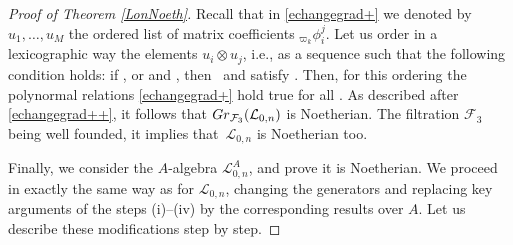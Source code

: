 \documentclass[11pt]{article}
\numberwithin{equation}{section}
\numberwithin{equation}{section}
\theoremstyle{definition}
\newcommand{\Ll}{{\mathcal L}}
\begin{document}
\begin{proof}[Proof of Theorem \ref{LonNoeth}]
Recall that in \eqref{echangegrad+} we denoted by $u_1,\dots,u_M$ the ordered list of matrix coefficients ${}_{\varpi_k}\phi_{i}^{j}$. Let us order in a lexicographic way the elements $u_i\otimes u_j$, i.e., as a sequence  such that the following condition holds: if , or  and , then~ and  satisfy . Then, for this ordering the polynormal relations \eqref{echangegrad+} hold true for all . As described after \eqref{echangegrad++}, it follows that ${\rm Gr}_{\mathcal{F}_3}(\Ll_{0,n})$ is Noetherian. The filtration $\mathcal{F}_3$ being well founded, it implies that~$\Ll_{0,n}$ is Noetherian too.

Finally, we consider the $A$-algebra $\Ll_{0,n}^A$, and prove it is Noetherian. We proceed in exactly the same way as for $\Ll_{0,n}$, changing the generators and replacing key arguments of the steps (i)--(iv) by the corresponding results over $A$. Let us describe these modifications step by step.


\end{proof}
\end{document}
